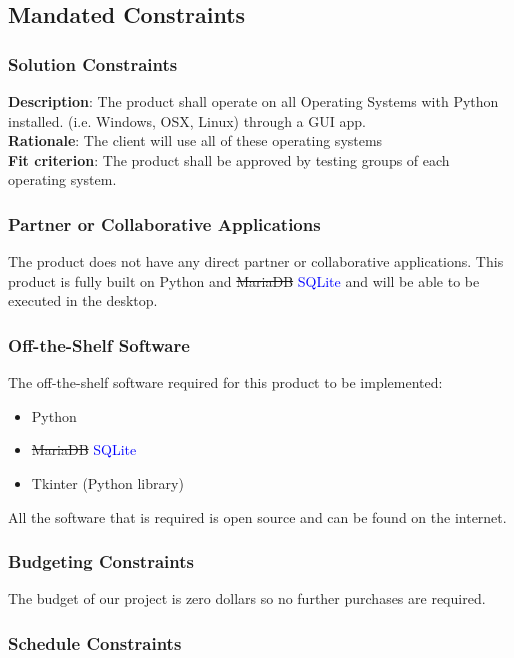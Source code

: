 \documentclass[12pt, titlepage]{article}
\begin{document}
\subsection{Mandated Constraints}

\subsubsection{Solution Constraints}

\textbf{Description}: The product shall operate on all Operating Systems with Python installed. (i.e. Windows, OSX, Linux) through a GUI app.
\\
\textbf{Rationale}: The client will use all of these operating systems
\\
\textbf{Fit criterion}: The product shall be approved by testing groups of each operating system.

\subsubsection{Partner or Collaborative Applications}

The product does not have any direct partner or collaborative applications. This product is fully built on Python and \sout{MariaDB} \textcolor{blue}{SQLite} and will be able to be executed in the desktop.

\subsubsection{Off-the-Shelf Software}

The off-the-shelf software required for this product to be implemented:
\begin{itemize}
\item Python
\item \sout{MariaDB} \textcolor{blue}{SQLite}
\item Tkinter (Python library)
\end{itemize}
All the software that is required is open source and can be found on the internet.

\subsubsection{Budgeting Constraints}

The budget of our project is zero dollars so no further purchases are required.

\subsubsection{Schedule Constraints}
\end{document}
